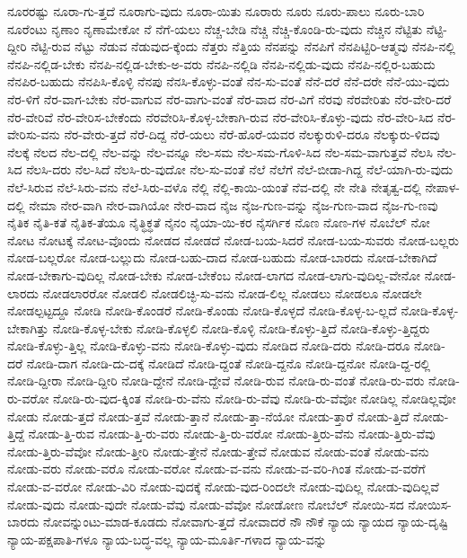 {ನೂರರಷ್ಟು
ನೂರಾ-ಗು-ತ್ತದೆ
ನೂರಾಗು-ವುದು
ನೂರಾ-ಯಿತು
ನೂರಾರು
ನೂರು
ನೂರು-ಪಾಲು
ನೂರು-ಬಾರಿ
ನೂರೆಂಟು
ನೃಣಾಂ
ನೃಣಾಮೇಕೋ
ನೆ
ನೆಗೆ-ಯಲು
ನೆಚ್ಚ-ಬೇಡಿ
ನೆಚ್ಚಿ
ನೆಚ್ಚಿ-ಕೊಂಡಿ-ರು-ವುದು
ನೆಚ್ಚಿನ
ನೆಟ್ಟಿತು
ನೆಟ್ಟಿ-ದ್ದೀರಿ
ನೆಟ್ಟಿ-ರುವ
ನೆಟ್ಟು
ನೆಡುವ
ನೆಡುವುದ-ಕ್ಕೆಂದು
ನೆತ್ತರು
ನೆತ್ತಿಯ
ನೆನಪನ್ನು
ನೆನಪಿಗೆ
ನೆನಪಿಟ್ಟಿರಿ-ಆತ್ಮವು
ನೆನಪಿ-ನಲ್ಲಿ
ನೆನಪಿ-ನಲ್ಲಿಡ-ಬೇಕು
ನೆನಪಿ-ನಲ್ಲಿಡ-ಬೇಕು-ಅ-ವರು
ನೆನಪಿ-ನಲ್ಲಿಡಿ
ನೆನಪಿ-ನಲ್ಲಿಡು-ವುದು
ನೆನಪಿ-ನಲ್ಲಿರ-ಬಹುದು
ನೆನಪಿರ-ಬಹುದು
ನೆನಪಿಸಿ-ಕೊಳ್ಳಿ
ನೆನಪು
ನೆನಸಿ-ಕೊಳ್ಳು-ವಂತೆ
ನೆನ-ಸು-ವಂತೆ
ನೆನೆ-ದರೆ
ನೆನೆ-ದರೇ
ನೆನೆ-ಯು-ವುದು
ನೆರ-ಳಿಗೆ
ನೆರ-ವಾಗ-ಬೇಕು
ನೆರ-ವಾಗುವ
ನೆರ-ವಾಗು-ವಂತೆ
ನೆರ-ವಾದ
ನೆರ-ವಿಗೆ
ನೆರವು
ನೆರವೇರಿತು
ನೆರ-ವೇರಿ-ದರೆ
ನೆರ-ವೇರಿವೆ
ನೆರ-ವೇರಿಸ-ಬೇಕೆಂದು
ನೆರವೇರಿಸಿ-ಕೊಳ್ಳ-ಬೇಕಾಗಿ-ರುವ
ನೆರ-ವೇರಿಸಿ-ಕೊಳ್ಳು-ವುದು
ನೆರ-ವೇರಿ-ಸಿದ
ನೆರ-ವೇರಿಸು-ವನು
ನೆರ-ವೇರು-ತ್ತದೆ
ನೆರೆ-ದಿದ್ದ
ನೆರೆ-ಯಲು
ನೆರೆ-ಹೊರೆ-ಯವರ
ನೆಲಕ್ಕುರುಳಿ-ದರೂ
ನೆಲಕ್ಕುರು-ಳಿದವು
ನೆಲಕ್ಕೆ
ನೆಲದ
ನೆಲ-ದಲ್ಲಿ
ನೆಲ-ವನ್ನು
ನೆಲ-ವನ್ನೂ
ನೆಲ-ಸಮ
ನೆಲ-ಸಮ-ಗೊಳಿ-ಸಿದ
ನೆಲ-ಸಮ-ವಾಗುತ್ತವೆ
ನೆಲಸಿ
ನೆಲ-ಸಿದ
ನೆಲಸಿ-ದರು
ನೆಲ-ಸಿದೆ
ನೆಲಸಿ-ರು-ವುದೋ
ನೆಲ-ಸು-ವಂತೆ
ನೆಲೆ
ನೆಲೆಗೆ
ನೆಲೆ-ಬೀಡಾ-ಗಿದ್ದ
ನೆಲೆ-ಯಾಗಿ-ರು-ವುದು
ನೆಲೆ-ಸಿರುವ
ನೆಲೆ-ಸಿರು-ವನು
ನೆಲೆ-ಸಿರು-ವಳೊ
ನೆಲ್ಲಿ
ನೆಲ್ಲಿ-ಕಾಯಿ-ಯಂತೆ
ನೆವ-ದಲ್ಲಿ
ನೇ
ನೇತಿ
ನೇತೃತ್ವ-ದಲ್ಲಿ
ನೇಪಾಳ-ದಲ್ಲಿ
ನೇಮಾ
ನೇರ-ವಾಗಿ
ನೇರ-ವಾಗಿಯೋ
ನೇರ-ವಾದ
ನೈಜ
ನೈಜ-ಗುಣ-ವನ್ನು
ನೈಜ-ಗುಣ-ವಾದ
ನೈಜ-ಗು-ಣವು
ನೈತಿಕ
ನೈತಿ-ಕತೆ
ನೈತಿಕ-ತೆಯೂ
ನೈತ್ಧಿಕ್ಧತೆ
ನೈನಂ
ನೈಯಾ-ಯಿ-ಕರ
ನೈಸರ್ಗಿಕ
ನೊಣ
ನೊಣ-ಗಳ
ನೊಬೆಲ್
ನೋ
ನೋಟ
ನೋಟಕ್ಕೆ
ನೋಟ-ವೊಂದು
ನೋಡದ
ನೋಡದೆ
ನೋಡ-ಬಯ-ಸಿದರೆ
ನೋಡ-ಬಯ-ಸುವರು
ನೋಡ-ಬಲ್ಲರು
ನೋಡ-ಬಲ್ಲರೋ
ನೋಡ-ಬಲ್ಲುದು
ನೋಡ-ಬಹು-ದಾದ
ನೋಡ-ಬಹುದು
ನೋಡ-ಬಾರದು
ನೋಡ-ಬೇಕಾಗಿದೆ
ನೋಡ-ಬೇಕಾಗು-ವುದಿಲ್ಲ
ನೋಡ-ಬೇಕು
ನೋಡ-ಬೇಕೆಂಬ
ನೋಡ-ಲಾಗದ
ನೋಡ-ಲಾಗು-ವುದಿಲ್ಲ-ವೇನೋ
ನೋಡ-ಲಾರದು
ನೋಡಲಾರರೋ
ನೋಡಲಿ
ನೋಡಲಿಚ್ಛಿ-ಸು-ವನು
ನೋಡ-ಲಿಲ್ಲ
ನೋಡಲು
ನೋಡಲೂ
ನೋಡಲೇ
ನೋಡಲ್ಪಟ್ಟದ್ದೂ
ನೋಡಿ
ನೋಡಿ-ಕೊಂಡರೆ
ನೋಡಿ-ಕೊಂಡು
ನೋಡಿ-ಕೊಳ್ಳದೆ
ನೋಡಿ-ಕೊಳ್ಳ-ಬ-ಲ್ಲದೆ
ನೋಡಿ-ಕೊಳ್ಳ-ಬೇಕಾಗಿತ್ತು
ನೋಡಿ-ಕೊಳ್ಳ-ಬೇಕು
ನೋಡಿ-ಕೊಳ್ಳಲಿ
ನೋಡಿ-ಕೊಳ್ಳಿ
ನೋಡಿ-ಕೊಳ್ಳು-ತ್ತಿದೆ
ನೋಡಿ-ಕೊಳ್ಳು-ತ್ತಿದ್ದರು
ನೋಡಿ-ಕೊಳ್ಳು-ತ್ತಿಲ್ಲ
ನೋಡಿ-ಕೊಳ್ಳು-ವನು
ನೋಡಿ-ಕೊಳ್ಳು-ವುದು
ನೋಡಿದ
ನೋಡಿ-ದರು
ನೋಡಿ-ದರೂ
ನೋಡಿ-ದರೆ
ನೋಡಿ-ದಾಗ
ನೋಡಿ-ದು-ದಕ್ಕೆ
ನೋಡಿದೆ
ನೋಡಿ-ದ್ದಂತೆ
ನೋಡಿ-ದ್ದನೊ
ನೋಡಿ-ದ್ದನೋ
ನೋಡಿ-ದ್ದ-ರಲ್ಲಿ
ನೋಡಿ-ದ್ದೀರಾ
ನೋಡಿ-ದ್ದೀರಿ
ನೋಡಿ-ದ್ದೇನೆ
ನೋಡಿ-ದ್ದೇವೆ
ನೋಡಿ-ರುವ
ನೋಡಿ-ರು-ವಂತೆ
ನೋಡಿ-ರು-ವರು
ನೋಡಿ-ರು-ವರೋ
ನೋಡಿ-ರು-ವುದ-ಕ್ಕಿಂತ
ನೋಡಿ-ರು-ವೆನು
ನೋಡಿ-ರು-ವೆವು
ನೋಡಿ-ರು-ವೆವೋ
ನೋಡಿಲ್ಲ
ನೋಡಿಲ್ಲವೋ
ನೋಡು
ನೋಡು-ತ್ತದೆ
ನೋಡು-ತ್ತವೆ
ನೋಡು-ತ್ತಾನೆ
ನೋಡು-ತ್ತಾ-ನೆಯೋ
ನೋಡು-ತ್ತಾರೆ
ನೋಡು-ತ್ತಿದೆ
ನೋಡು-ತ್ತಿದ್ದೆ
ನೋಡು-ತ್ತಿ-ರುವ
ನೋಡು-ತ್ತಿ-ರು-ವರು
ನೋಡು-ತ್ತಿ-ರು-ವರೋ
ನೋಡು-ತ್ತಿರು-ವೆನು
ನೋಡು-ತ್ತಿರು-ವೆವು
ನೋಡು-ತ್ತಿರು-ವೆವೋ
ನೋಡು-ತ್ತೀರಿ
ನೋಡು-ತ್ತೇನೆ
ನೋಡು-ತ್ತೇವೆ
ನೋಡುವ
ನೋಡು-ವಂತೆ
ನೋಡು-ವನು
ನೋಡು-ವರು
ನೋಡು-ವರೊ
ನೋಡು-ವರೋ
ನೋಡು-ವ-ವನು
ನೋಡು-ವ-ವರಿ-ಗಿಂತ
ನೋಡು-ವ-ವರೆಗೆ
ನೋಡು-ವ-ವರೋ
ನೋಡು-ವಿರಿ
ನೋಡು-ವುದಕ್ಕೆ
ನೋಡು-ವುದ-ರಿಂದಲೇ
ನೋಡು-ವುದಿಲ್ಲ
ನೋಡು-ವುದಿಲ್ಲವೆ
ನೋಡು-ವುದು
ನೋಡು-ವುದೇ
ನೋಡು-ವೆವು
ನೋಡು-ವೆವೋ
ನೋಡೋಣ
ನೋಬೆಲ್
ನೋಯಿ-ಸದ
ನೋಯಿಸ-ಬಾರದು
ನೋವನ್ನುಂಟು-ಮಾಡ-ಕೂಡದು
ನೋವಾಗು-ತ್ತದೆ
ನೋವಾದರೆ
ನೌ
ನೌಕೆ
ನ್ಯಾಯ
ನ್ಯಾಯದ
ನ್ಯಾಯ-ದೃಷ್ಟಿ
ನ್ಯಾಯ-ಪಕ್ಷಪಾತಿ-ಗಳೂ
ನ್ಯಾಯ-ಬದ್ಧ-ವಲ್ಲ
ನ್ಯಾಯ-ಮೂರ್ತಿ-ಗಳಾದ
ನ್ಯಾಯ-ವನ್ನು
}
